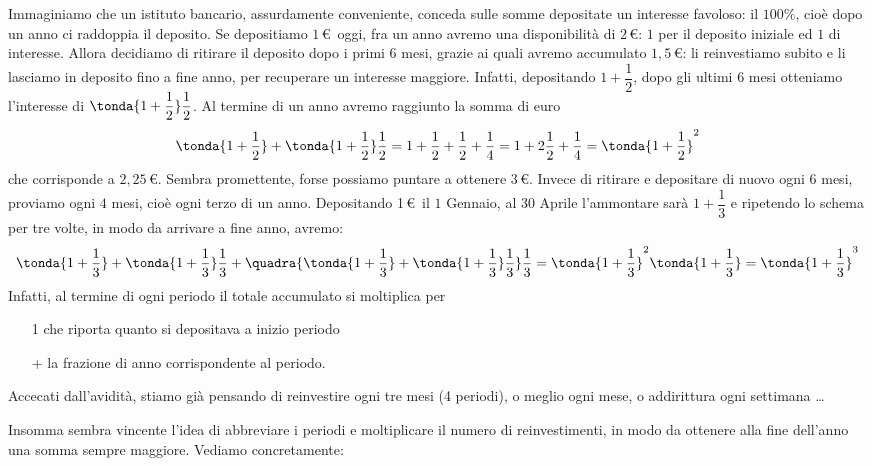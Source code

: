 Immaginiamo che un istituto bancario, assurdamente conveniente, conceda 
sulle somme depositate un interesse favoloso: il \(100\%\), cioè dopo un 
anno ci raddoppia il deposito. Se depositiamo \(1\)\,\euro\ oggi, 
fra un anno avremo una disponibilità di \(2\)\,\euro: \(1\) per il deposito 
iniziale ed \(1\) di interesse. 
Allora decidiamo di ritirare il deposito dopo i primi \(6\) mesi, grazie ai 
quali avremo accumulato \(1,5\)\,\euro: li reinvestiamo subito e li
lasciamo in deposito fino a fine anno, per recuperare un interesse maggiore. 
Infatti, depositando \(1+\dfrac{1}{2}\), dopo gli ultimi \(6\) mesi 
otteniamo l'interesse di \(\tonda{1+\dfrac{1}{2}}\dfrac{1}{2}\). 
Al termine di un anno avremo raggiunto la somma di euro
\[\tonda{1+\dfrac{1}{2}}+\tonda{1+\dfrac{1}{2}}\dfrac{1}{2}=
1+\dfrac{1}{2}+\dfrac{1}{2}+\dfrac{1}{4}=
1+2\dfrac{1}{2}+\dfrac{1}{4}=
\tonda{1+\dfrac{1}{2}}^2\]
che corrisponde a \(2,25\)\,\euro. 
Sembra promettente, forse possiamo puntare a ottenere \(3\)\,\euro. 
Invece di ritirare e depositare di nuovo ogni \(6\) mesi, 
proviamo ogni \(4\) mesi, cioè ogni terzo di un anno. 
Depositando 1\,\euro\ il \(1\) Gennaio, al 30 Aprile l'ammontare sarà 
\(1+\dfrac{1}{3}\) e ripetendo lo schema per tre volte, in modo da 
arrivare a fine anno, avremo:
\[
 \tonda{1+\dfrac{1}{3}}+\tonda{1+\dfrac{1}{3}}\dfrac{1}{3}+ 
\quadra{\tonda{1+\dfrac{1}{3}}+\tonda{1+\dfrac{1}{3}}\dfrac{1}{3}}\dfrac{1}{3}=
\tonda{1+\dfrac{1}{3}}^2\tonda{1+\dfrac{1}{3}}= 
\tonda{1+\dfrac{1}{3}}^3
\]
Infatti, al termine di ogni periodo il totale accumulato si moltiplica per
\begin{itemize}[nosep, noitemsep]
 \item [1]che riporta quanto si depositava a inizio periodo
 \item [+]la frazione di anno corrispondente al periodo.
\end{itemize}
Accecati dall'avidità, stiamo già pensando di reinvestire ogni tre mesi (4 
periodi), o meglio ogni mese, o addirittura ogni settimana \dots 

Insomma sembra vincente l'idea di abbreviare i periodi e moltiplicare il numero 
di reinvestimenti, in modo da ottenere alla fine dell'anno una somma sempre 
maggiore. Vediamo concretamente:

